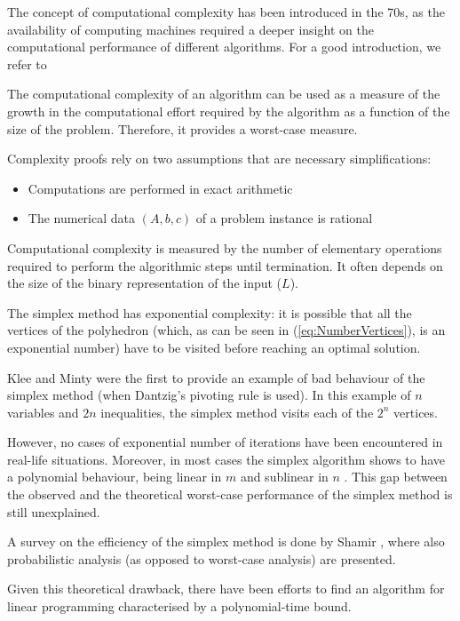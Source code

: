 The concept of computational complexity has been introduced in the 70s,
as the availability of computing machines required a deeper insight
on the computational performance of different algorithms.
For a good introduction, we refer to \cite[ch.~2]{Schrijver86}

The computational complexity of an algorithm can be used as a measure
of the growth in the computational effort required by the algorithm
as a function of the size of the problem. Therefore, it provides 
a worst-case measure.

Complexity proofs rely on two assumptions that are necessary 
simplifications:
\begin{itemize}
\item Computations are performed in exact arithmetic
\item The numerical data $(A, b, c)$ of a problem instance is rational
\end{itemize}

Computational complexity is measured by the number of elementary operations
required to perform the algorithmic steps until termination. It often depends 
on the size of the binary representation of the input ($L$).


The simplex method has exponential complexity: it is possible that all
the vertices of the polyhedron (which, as can be seen in
(\ref{eq:NumberVertices}), is an exponential number) have to be visited
before reaching an optimal solution.

Klee and Minty \cite{KleeMinty} were the first to provide an example 
of bad behaviour of the simplex method (when Dantzig's pivoting rule 
is used). In this example of $n$ variables and $2n$ inequalities,
the simplex method visits each of the $2^n$ vertices.

However, no cases of exponential number of iterations have been encountered 
in real-life situations. Moreover, in most cases the simplex algorithm shows 
to have a polynomial behaviour, being linear in $m$ and sublinear in $n$
\cite[p.94]{FangPuthenpura93}.
This gap between the observed and the theoretical worst-case performance
of the simplex method is still unexplained.

A survey on the efficiency of the simplex method is done by Shamir 
\cite{Shamir87}, where also probabilistic analysis (as opposed to
worst-case analysis) are presented.

Given this theoretical drawback, there have been efforts to find an
algorithm for linear programming characterised by a polynomial-time bound.

